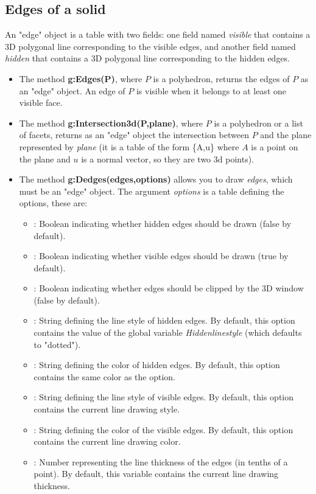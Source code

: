 \subsection{Edges of a solid}

An "edge" object is a table with two fields: one field named \emph{visible} that contains a 3D polygonal line corresponding to the visible edges, and another field named \emph{hidden} that contains a 3D polygonal line corresponding to the hidden edges.

\begin{itemize}
    \item The method \textbf{g:Edges(P)}, where $P$ is a polyhedron, returns the edges of $P$ as an "edge" object. An edge of $P$ is visible when it belongs to at least one visible face.     \item The method \textbf{g:Intersection3d(P,plane)}, where $P$ is a polyhedron or a list of facets, returns as an "edge" object the intersection between $P$ and the plane represented by \emph{plane} (it is a table of the form \{A,u\} where $A$ is a point on the plane and $u$ is a normal vector, so they are two 3d points).
    \item The method \textbf{g:Dedges(edges,options)} allows you to draw \emph{edges}, which must be an "edge" object. The argument \emph{options} is a table defining the options, these are:
\begin{itemize}
    \item {}: Boolean indicating whether hidden edges should be drawn (false by default).
    \item {}: Boolean indicating whether visible edges should be drawn (true by default).
    \item {}: Boolean indicating whether edges should be clipped by the 3D window (false by default).
    \item {}: String defining the line style of hidden edges. By default, this option contains the value of the global variable \emph{Hiddenlinestyle} (which defaults to "dotted").
    \item {}: String defining the color of hidden edges. By default, this option contains the same color as the  option.
    \item {}: String defining the line style of visible edges. By default, this option contains the current line drawing style.     \item {}: String defining the color of the visible edges. By default, this option contains the current line drawing color.
    \item {}: Number representing the line thickness of the edges (in tenths of a point). By default, this variable contains the current line drawing thickness.
\end{itemize}


\end{itemize}
